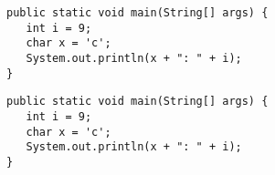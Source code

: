 \documentclass{beamer}
\begin{document}
\begin{frame}[fragile]
\begin{verbatim}
public static void main(String[] args) {
   int i = 9;
   char x = 'c';
   System.out.println(x + ": " + i);
}
\end{verbatim}
\endAnimateCode
\end{frame}

\begin{frame}[fragile]
\begin{verbatim}
public static void main(String[] args) {
   int i = 9;
   char x = 'c';
   System.out.println(x + ": " + i);
}
\end{verbatim}
\end{frame}
\end{document}
